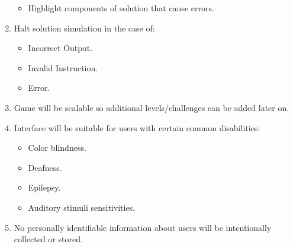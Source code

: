 \documentclass{article}
\begin{document}
\begin{enumerate}
\begin{itemize}
    \item Highlight components of solution that cause errors.
  \end{itemize}
  \item Halt solution simulation in the case of:
  \begin{itemize}
    \item Incorrect Output.
    \item Invalid Instruction.
    \item Error.
  \end{itemize}
  \item Game will be scalable so additional levels/challenges can be added later
  on.
  \item Interface will be suitable for users with certain common disabilities:
  \begin{itemize}
    \item Color blindness.
    \item Deafness.
    \item Epilepsy.
    \item Auditory stimuli sensitivities.
  \end{itemize}
  \item No personally identifiable information about users will be intentionally
  collected or stored.
\end{enumerate}
\end{document}
